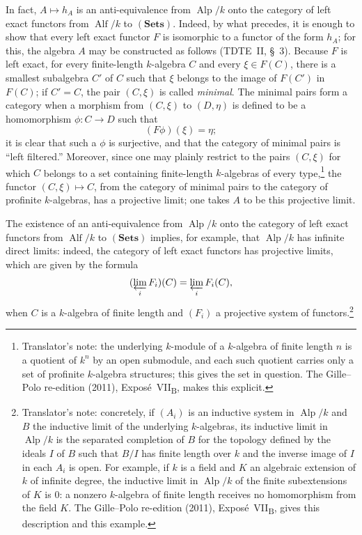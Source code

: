 In fact, \(A\mapsto h_A\) is an anti-equivalence from
\(\operatorname{Alp}/k\) onto the category of left exact functors from
\(\operatorname{Alf}/k\) to \((\mathbf{Sets})\). Indeed, by what precedes,
it is enough to show that every left exact functor \(F\) is isomorphic
to a functor of the form \(h_A\); for this, the algebra \(A\) may be
constructed as follows (TDTE~II, \S~3). Because \(F\) is left exact,
for every finite-length \(k\)-algebra \(C\) and every \(\xi\in F(C)\),
there is a smallest subalgebra \(C'\) of \(C\) such that \(\xi\) belongs
to the image of \(F(C')\) in \(F(C)\); if \(C'=C\), the pair
\((C,\xi)\) is called \emph{minimal}. The minimal pairs form a category
when a morphism from \((C,\xi)\) to \((D,\eta)\) is defined to be a
homomorphism \(\phi:C\to D\) such that
\[
  (F\phi)(\xi)=\eta;
\]
it is clear that such a \(\phi\) is surjective, and that the category of
minimal pairs is ``left filtered.'' Moreover, since one may plainly
restrict to the pairs \((C,\xi)\) for which \(C\) belongs to a set
containing finite-length \(k\)-algebras of every type,\footnote{Translator's note: the underlying
\(k\)-module of a \(k\)-algebra of finite length \(n\) is a quotient of \(k^n\) by an open submodule,
and each such quotient carries only a set of profinite \(k\)-algebra structures; this gives the set in
question. The Gille--Polo re-edition (2011), Expos\'e~VII\textsubscript{B}, makes this explicit.} the
functor \((C,\xi)\mapsto C\), from the category of minimal pairs to the
category of profinite \(k\)-algebras, has a projective limit; one takes
\(A\) to be this projective limit.

The existence of an anti-equivalence from \(\operatorname{Alp}/k\) onto
the category of left exact functors from \(\operatorname{Alf}/k\) to
\((\mathbf{Sets})\) implies, for example, that \(\operatorname{Alp}/k\)
has infinite direct limits: indeed, the category of left exact functors
has projective limits, which are given by the formula
\[
  (\varprojlim_iF_i)(C)=\varprojlim_iF_i(C),
\]
when \(C\) is a \(k\)-algebra of finite length and \((F_i)\) a
projective system of functors.\footnote{Translator's note: concretely, if \((A_i)\) is an inductive system
in \(\operatorname{Alp}/k\) and \(B\) the inductive limit of the underlying \(k\)-algebras, its
inductive limit in \(\operatorname{Alp}/k\) is the separated completion of \(B\) for the topology
defined by the ideals \(I\) of \(B\) such that \(B/I\) has finite length over \(k\) and the inverse
image of \(I\) in each \(A_i\) is open. For example, if \(k\) is a field and \(K\) an algebraic extension
of \(k\) of infinite degree, the inductive limit in \(\operatorname{Alp}/k\) of the finite subextensions
of \(K\) is \(0\): a nonzero \(k\)-algebra of finite length receives no homomorphism from the field
\(K\). The Gille--Polo re-edition (2011), Expos\'e~VII\textsubscript{B}, gives this description and this
example.}
